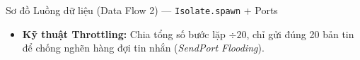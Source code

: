 \documentclass[aspectratio=169, 10pt]{beamer}
\begin{document}
\begin{frame}{Sơ đồ Luồng dữ liệu (Data Flow 2) --- \texttt{Isolate.spawn} + Ports}
  \vspace{0.15cm}
  \begin{itemize}
    \item \textbf{Kỹ thuật Throttling:} Chia tổng số bước lặp $\div 20$, chỉ gửi đúng 20 bản tin để chống nghẽn hàng đợi tin nhắn (\textit{SendPort Flooding}).
  \end{itemize}
\end{frame}

\end{document}
